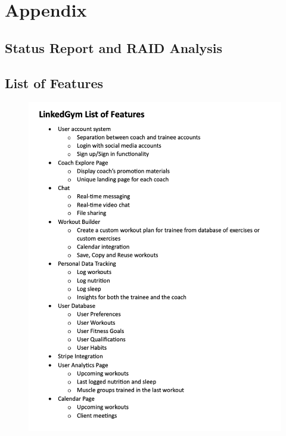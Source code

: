 \section{Appendix}

\subsection{Status Report and RAID Analysis}



\subsection{List of Features}

 \begin{figure}[H]
    \centering
    \includegraphics[width=1\textwidth]{Resources/listoff.png}
  \end{figure}


%
